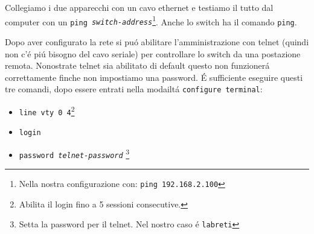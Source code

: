 \documentclass[9pt, a4paper, oneside]{article}
\begin{document}
				Collegiamo i due apparecchi con un cavo 
				ethernet e testiamo il tutto dal computer con 
				un \texttt{ping 
				\emph{switch-address}}\footnote{Nella nostra 
				configurazione con: \texttt{ping 
				192.168.2.100}}. Anche lo switch ha il 
				comando \texttt{ping}.
			\par
				Dopo aver configurato la rete si pu\'o 
				abilitare l'amministrazione con telnet (quindi 
				non c'\'e pi\'u bisogno del cavo seriale) per 
				controllare lo switch da una postazione remota. 
				Nonostrate telnet sia abilitato di default 
				questo non funzioner\'a correttamente finche 
				non impostiamo una password. \'E sufficiente 
				eseguire questi tre comandi, dopo essere 
				entrati nella modailt\'a \texttt{configure 
				terminal}:
				\begin{itemize}
					\item
						\texttt{line vty 0 
						4}\footnote{Abilita il login 
						fino a 5 sessioni 
						consecutive.}
					\item
						\texttt{login}
					\item
						\texttt{password 
						\emph{telnet-password}}
						\footnote{Setta la password 
						per il telnet. Nel nostro caso 
						\'e \texttt{labreti}}
				\end{itemize}
\end{document}
